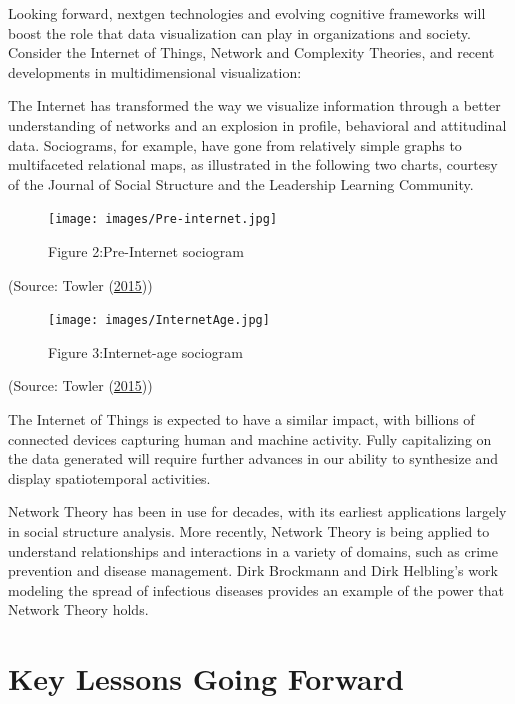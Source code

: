 \documentclass[]{book}
\begin{document}
Looking forward, nextgen technologies and evolving cognitive frameworks will boost the role that data visualization can play in organizations and society. Consider the Internet of Things, Network and Complexity Theories, and recent developments in multidimensional visualization:

The Internet has transformed the way we visualize information through a better understanding of networks and an explosion in profile, behavioral and attitudinal data. Sociograms, for example, have gone from relatively simple graphs to multifaceted relational maps, as illustrated in the following two charts, courtesy of the Journal of Social Structure and the Leadership Learning Community.

\begin{figure}
\centering
\texttt{[image: images/Pre-internet.jpg]}
\caption{Figure 2:Pre-Internet sociogram}
\end{figure}

(Source: Towler (\protect\hyperlink{ref-future_viz}{2015}))

\begin{figure}
\centering
\texttt{[image: images/InternetAge.jpg]}
\caption{Figure 3:Internet-age sociogram}
\end{figure}

(Source: Towler (\protect\hyperlink{ref-future_viz}{2015}))

The Internet of Things is expected to have a similar impact, with billions of connected devices capturing human and machine activity. Fully capitalizing on the data generated will require further advances in our ability to synthesize and display spatiotemporal activities.

Network Theory has been in use for decades, with its earliest applications largely in social structure analysis. More recently, Network Theory is being applied to understand relationships and interactions in a variety of domains, such as crime prevention and disease management. Dirk Brockmann and Dirk Helbling's work modeling the spread of infectious diseases provides an example of the power that Network Theory holds.

\hypertarget{key-lessons-going-forward}{%
\section{Key Lessons Going Forward}\label{key-lessons-going-forward}}
\end{document}
